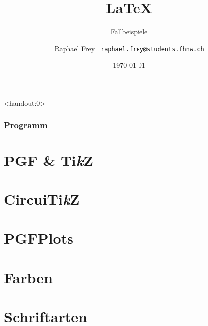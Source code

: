 \documentclass{beamer}                %
\title{\vspace*{4em}\Huge\LaTeX}
\subtitle{\hfill Fallbeispiele}
\date{\today}
\author{%
    Raphael Frey%
    \hfill%
    \scriptsize\texttt{%
        \href{mailto:raphael.frey@students.fhnw.ch}%
        {raphael.frey@students.fhnw.ch}}}
\def\TikZ{Ti\emph{k}Z}
\begin{document}
                                                              

\frame[plain]{\titlepage} %


\begin{frame}<handout:0> %
    \frametitle{Programm}
    \tableofcontents
\end{frame}


\section<handout:0>{PGF \& \TikZ} %

\section<handout:0>{Circui\TikZ} %

\section<handout:0>{PGFPlots} %

\section<handout:0>{Farben} %

\section<handout:0>{Schriftarten} %
\end{document}
